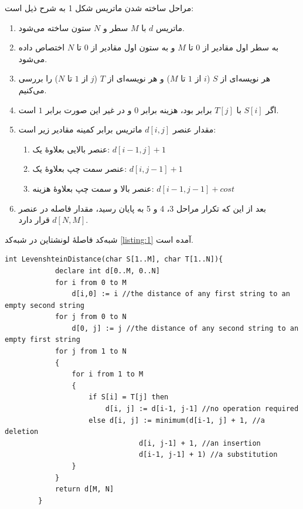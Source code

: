 \documentclass[12pt,onecolumn,a4paper]{article}
\begin{document}
    \par
    مراحل ساخته شدن ماتریس شکل 1 به شرح ذیل است:
    \begin{enumerate}
        \item ماتریس $d$ با $M$ سطر و $N$ ستون ساخته می‌شود.
        \item به سطر اول مقادیر از $0$ تا $M$ و به ستون اول مقادیر از $0$ تا $N$ اختصاص داده می‌شود.
        \item هر نویسه‌ای از $S$ ($i$ از $1$ تا $M$)  و هر نویسه‌ای از $T$ ($j$ از $1$ تا $N$) را بررسی می‌کنیم.
        \item اگر $S[i]$ با $T[j]$ برابر بود، هزینه برابر $0$ و در غیر این صورت برابر $1$ است.
        \item مقدار عنصر $d[i, j]$ ماتریس برابر کمینه مقادیر زیر است:
        \begin{enumerate}
            \item عنصر بالایی بعلاوۀ یک: $d[i-1, j]+1$
            \item عنصر سمت چپ بعلاوۀ یک: $d[i, j-1]+1$
            \item عنصر بالا و سمت چپ بعلاوۀ هزینه: $d[i-1, j-1]+cost$
        \end{enumerate}
        \item بعد از این که تکرار مراحل 3، 4 و 5 به پایان رسید، مقدار فاصله در عنصر $d[N,M]$ قرار دارد.
    \end{enumerate}

    \par
    شبه‌کد فاصلۀ لونشتاین در شبه‌کد \ref{listing:1} آمده است.

    \begin{LTR}
        \begin{lstlisting}[style=C++Style,caption=\rl{فاصلۀ لونشتاین}, label={listing:1}]
        int LevenshteinDistance(char S[1..M], char T[1..N]){
            declare int d[0..M, 0..N]
            for i from 0 to M
                d[i,0] := i //the distance of any first string to an empty second string
            for j from 0 to N
                d[0, j] := j //the distance of any second string to an empty first string
            for j from 1 to N
            {
                for i from 1 to M
                {
                    if S[i] = T[j] then
                        d[i, j] := d[i-1, j-1] //no operation required
                    else d[i, j] := minimum(d[i-1, j] + 1, //a deletion
                                d[i, j-1] + 1, //an insertion
                                d[i-1, j-1] + 1) //a substitution
                }
            }
            return d[M, N]
        }
        \end{lstlisting}
    \end{LTR}
\end{document}
